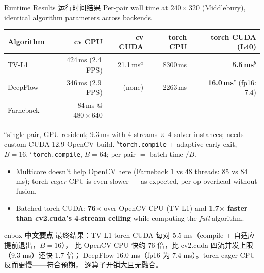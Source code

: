 \documentclass[aspectratio=169,10pt]{beamer}
\makeatletter
\newcommand{\zh}[1]{{\zhfont #1}}
\newenvironment{cn}{%
  \begin{beamercolorbox}[rounded=true,sep=4pt,wd=\textwidth]{cnbox}\zhfont\footnotesize
  {\color{cblue!70!black}\textbf{中文要点}}\quad}%
  {\end{beamercolorbox}}
\newcommand{\tvlCvCpuMs}{424}     %
\newcommand{\tvlCvCpuFps}{2.4}
\newcommand{\dfCvCpuMs}{346}      %
\newcommand{\dfCvCpuFps}{2.9}
\newcommand{\fbCvCpuMs}{84}       %
\newcommand{\tvlCvCudaMs}{21.1}   %
\newcommand{\tvlCvCudaStreamMs}{9.3} %
\newcommand{\tvlTorchCpuMs}{8300} %
\newcommand{\tvlTorchGpuMs}{5.5}  %
\newcommand{\dfTorchCpuMs}{2263}  %
\newcommand{\dfTorchGpuMs}{16.0}  %
\newcommand{\dfTorchGpuFpMs}{7.4} %
\makeatother
\begin{document}
\begin{frame}{Runtime Results \zh{运行时间结果}}
  \centering
  {\small Per-pair wall time at $240{\times}320$ (Middlebury), identical
   algorithm parameters across backends.}
  \par\medskip
  \begin{tabular}{@{}lrrrr@{}}
    \toprule
    Algorithm & \textcolor{cblue}{cv CPU} & \textcolor{corange}{cv CUDA}
      & \textcolor{caqua!70!black}{torch CPU} & \textcolor{cyellow!70!black}{torch CUDA (L40)} \\
    \midrule
    TV-L1    & \tvlCvCpuMs\,ms (\tvlCvCpuFps\,FPS)
             & \tvlCvCudaMs\,ms$^{a}$ & \tvlTorchCpuMs\,ms
             & \textbf{\tvlTorchGpuMs\,ms}$^{b}$ \\
    DeepFlow & \dfCvCpuMs\,ms (\dfCvCpuFps\,FPS)
             & --- (none) & \dfTorchCpuMs\,ms
             & \textbf{\dfTorchGpuMs\,ms}$^{c}$ (fp16: \dfTorchGpuFpMs) \\
    Farneback & \fbCvCpuMs\,ms @$480{\times}640$ & --- & --- & --- \\
    \bottomrule
  \end{tabular}
  \par\smallskip
  {\scriptsize $^{a}$single pair, GPU-resident; \tvlCvCudaStreamMs\,ms with
   4 streams $\times$ 4 solver instances; needs custom CUDA 12.9 OpenCV build.\quad
   $^{b}$\texttt{torch.compile} + adaptive early exit, $B{=}16$.\quad
   $^{c}$\texttt{torch.compile}, $B{=}64$; per pair $=$ batch time $/B$.}
  \par\smallskip
  \begin{itemize}\itemsep1pt
    \item Multicore doesn't help OpenCV here (Farneback 1 vs 48 threads: 85 vs
      84\,ms); torch \emph{eager} CPU is even slower --- as expected, per-op
      overhead without fusion.
    \item Batched torch CUDA: \textbf{76$\times$} over OpenCV CPU (TV-L1) and
      \textbf{1.7$\times$ faster than cv2.cuda's 4-stream ceiling} while
      computing the \emph{full} algorithm.
  \end{itemize}
  \vfill
  \begin{cn}
    最终结果：TV-L1 torch CUDA 每对 5.5 ms（compile + 自适应提前退出，$B{=}16$），
    比 OpenCV CPU 快约 76 倍，比 cv2.cuda 四流并发上限（9.3 ms）还快 1.7 倍；
    DeepFlow 16.0 ms（fp16 为 7.4 ms）。torch eager CPU 反而更慢——符合预期，
    逐算子开销大且无融合。
  \end{cn}
\end{frame}
\end{document}

